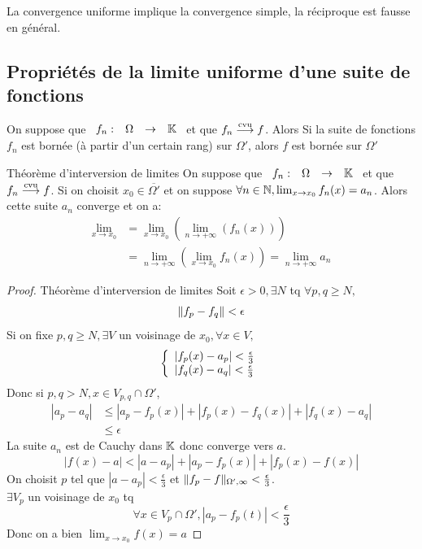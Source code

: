 \documentclass[]{report}
\begin{document}
\begin{prop}{}{}
    La convergence uniforme implique la convergence simple, la réciproque est fausse en général.
\end{prop}

\subsection{Propriétés de la limite uniforme d'une suite de fonctions}

\begin{prop}{}{}
    On suppose que $\begin{array}{ccccc} f_n : & \Omega & \to & \mathbb{K} \end{array}$ et que $f_n\overset{\text{cvu}}{\longrightarrow} f$. Alors
    Si la suite de fonctions $f_n$ est bornée (à partir d'un certain rang) sur $\Omega'$, alors $f$ est bornée sur $\Omega'$
\end{prop}

\begin{tm}{Théorème d'interversion de limites}{}
    On suppose que $\begin{array}{ccccc} f_n : & \Omega & \to & \mathbb{K} \end{array}$ et que $f_n\overset{\text{cvu}}{\longrightarrow} f$. Si on choisit $x_0\in \overline{\Omega'}$ et on suppose $\forall n\in \mathbb{N}, \lim_{x\to x_0}f_n(x)=a_n$. Alors cette suite $a_n$ converge et on a:
    \begin{align*}
        \lim_{x\to x_0}&=\lim_{x\to x_0} \left(\lim_{n\to +\infty} (f_n(x))\right)\\
        &=\lim_{n\to +\infty} \left(\lim_{x\to x_0} f_n(x)\right)=\lim_{n\to +\infty} a_n
    \end{align*}
\end{tm}

\begin{proof}{Théorème d'interversion de limites}{}
    Soit $\epsilon>0,\exists N$ tq $\forall p,q\ge N,$
    \[\lVert f_p-f_q \rVert<\epsilon\]
    Si on fixe $p,q\ge N,\exists V$ un voisinage de $x_0,\forall x\in V,$
    \[\left\{\begin{array}{ll} \left|f_p(x)-a_p\right|<\frac{\epsilon}{3} \\ \left|f_q(x)-a_q\right|<\frac{\epsilon}{3} \end{array} \right.\]
    Donc si $p,q>N,x\in V_{p,q}\cap \Omega'$,
    \begin{align*}
        |a_p-a_q|&\le \left|a_p-f_p(x)\right|+\left|f_p(x)-f_q(x)\right|+\left| f_q(x)-a_q\right|\\
    &\le \epsilon 
    \end{align*}
    La suite $a_n$ est de Cauchy dans $\mathbb{K}$ donc converge vers $a$.
    \[\left|f(x)-a\right|<\left|a-a_p\right|+ \left|a_p-f_p(x)\right|+\left| f_p(x)-f(x)\right|\]
    On choisit $p$ tel que $\left|a-a_p\right|<\frac{\epsilon}{3}$ et $\lVert f_p-f \rVert_{\Omega',\infty}<\frac{\epsilon}{3}$.\\
    $\exists V_p$ un voisinage de $x_0$ tq
    \[\forall x\in V_p\cap \Omega',\left|a_p-f_p(t)\right|<\frac{\epsilon}{3}\]
    Donc on a bien $\lim_{x\to x_0} f(x)=a$
\end{proof}
\end{document}
